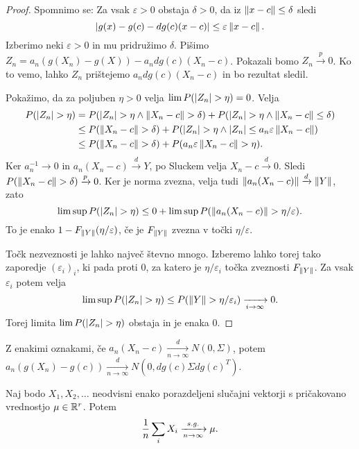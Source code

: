 \begin{proof}
  Spomnimo se:
  Za vsak $\varepsilon > 0$ obstaja $\delta > 0$, da iz $\left\lVert x -c\right\rVert \le \delta$
  sledi
  \[
	\left| g(x) - g(c) - dg(c)(x-c) \right| \le \varepsilon \left\lVert x-c\right\rVert.
  \]
  Izberimo neki $\varepsilon > 0$ in mu pridružimo $\delta$.
  Pišimo $Z_n = a_n (g(X_n) - g(X)) - a_n dg(c) (X_n - c)$.
  Pokazali bomo $Z_n \xrightarrow{p} 0$.
  Ko to vemo, lahko $Z_n$ prištejemo $a_n dg(c) (X_n - c)$ in bo rezultat
  sledil.

  Pokažimo, da za poljuben $\eta > 0$ velja $\lim P(\left| Z_n \right| > \eta) = 0$.
  Velja
  \begin{align*}
	P(\left| Z_n \right| > \eta)
	&= P(\left| Z_n \right| > \eta \land \left\lVert X_n - c\right\rVert > \delta)
	+ P(\left| Z_n \right| > \eta \land \left\lVert X_n - c\right\rVert \le \delta) \\
	&\le P(\left\lVert X_n - c\right\rVert > \delta) + P(\left| Z_n \right| > \eta
	  \land \left| Z_n \right| \le a_n \varepsilon \left\lVert X_n - c\right\rVert) \\
	&\le P(\left\lVert X_n - c\right\rVert > \delta) + P(a_n \varepsilon \left\lVert X_n - c\right\rVert > \eta).
  \end{align*}
  Ker $a_n^{-1} \to 0$ in $a_n (X_n - c) \xrightarrow{d} Y$, po Sluckem velja
  $X_n - c \xrightarrow{d} 0$.
  Sledi $P(\left\lVert X_n - c\right\rVert > \delta) \xrightarrow{p} 0$.
  Ker je norma zvezna, velja tudi $\left\lVert a_n (X_n - c)\right\rVert \xrightarrow{d}
  \left\lVert Y\right\rVert$, zato
  \[
	\limsup P(\left| Z_n \right| > \eta)
	\le 0 + \limsup P(\left\lVert a_n (X_n -c)\right\rVert > \eta / \varepsilon).
  \]
  To je enako $1 - F_{\left\lVert Y\right\rVert}(\eta / \varepsilon)$, če je $F_{\left\lVert Y\right\rVert}$
  zvezna v točki $\eta / \varepsilon$.

  Točk nezveznosti je lahko največ števno mnogo.
  Izberemo lahko torej tako zaporedje $(\varepsilon_i)_i$, ki pada proti $0$, za
  katero je $\eta / \varepsilon_i$ točka zveznosti $F_{\left\lVert Y\right\rVert}$.
  Za vsak $\varepsilon_i$ potem velja
  \[
	\limsup P(\left| Z_n \right| > \eta) \le P(\left\lVert Y\right\rVert > \eta / \varepsilon_i)
	\xrightarrow[i \to \infty]{} 0.
  \]
  Torej limita $\lim P(\left| Z_n \right| > \eta)$ obstaja in je enaka $0$.
\end{proof}

\begin{posledica}
  Z enakimi oznakami, če $a_n (X_n - c) \xrightarrow[n \to \infty]{d} N(0,
  \Sigma)$,
  potem $a_n(g(X_n) - g(c)) \xrightarrow[n \to \infty]{d} N(0, dg(c) \Sigma
  dg(c)^T)$.
\end{posledica}

\begin{izrek}
  Naj bodo $X_1, X_2, \ldots$ neodvisni enako porazdeljeni slučajni
  vektorji s pričakovano vrednostjo $\mu \in \mathbb{R}^r$.
  Potem
  \[
	\frac{1}{n} \sum_i X_i \xrightarrow[n \to \infty]{s.g.} \mu.
  \]
\end{izrek}

